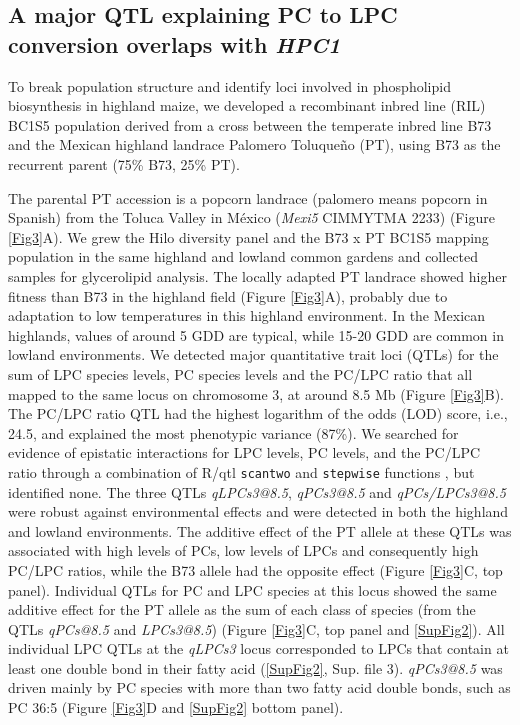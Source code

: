 \documentclass[9pt,twocolumn,twoside,lineno]{biorxiv}
\def\code#1{\texttt{#1}}
\begin{document}
\subsection{A major QTL explaining PC to LPC conversion overlaps with \textit{HPC1}} 
To break population structure and identify loci involved in phospholipid biosynthesis in highland maize, we developed a recombinant inbred line (RIL) BC1S5 population derived from a cross between the temperate inbred line B73 and the Mexican highland landrace Palomero Toluqueño (PT), using B73 as the recurrent parent (75\% B73, 25\% PT). 

The parental PT accession is a popcorn landrace (palomero means popcorn in Spanish) from the Toluca Valley in México (\textit{Mexi5} CIMMYTMA 2233) (Figure \ref{Fig3}A). 
We grew the Hilo diversity panel and the B73 x PT BC1S5 mapping population in the same highland and lowland common gardens and collected samples for glycerolipid analysis.
The locally adapted PT landrace showed higher fitness than B73 in the highland field (Figure \ref{Fig3}A), probably due to adaptation to low temperatures in this highland environment.  
In the Mexican highlands, values of around 5 GDD are typical, while 15-20 GDD are common in lowland environments. 
We detected major quantitative trait loci (QTLs) for the sum of LPC species levels, PC species levels and the PC/LPC ratio that all mapped to the same locus on chromosome 3, at around 8.5 Mb (Figure \ref{Fig3}B). 
The PC/LPC ratio QTL had the highest logarithm of the odds (LOD) score, i.e., 24.5, and explained the most phenotypic variance (87\%). 
We searched for evidence of epistatic interactions for LPC levels, PC levels, and the PC/LPC ratio through a combination of R/qtl \code{scantwo} and \code{stepwise} functions \cite{Broman2003-ac}, but identified none.
The three QTLs \textit{qLPCs3@8.5}, \textit{qPCs3@8.5} and \textit{qPCs/LPCs3@8.5} were robust against environmental effects and were detected in both the highland and lowland environments.
The additive effect of the PT allele at these QTLs was associated with high levels of PCs, low levels of LPCs and consequently high PC/LPC ratios, while the B73 allele had the opposite effect (Figure \ref{Fig3}C, top panel).
Individual QTLs for PC and LPC species at this locus showed the same additive effect for the PT allele as the sum of each class of species (from the QTLs \textit{qPCs@8.5} and \textit{LPCs3@8.5}) (Figure \ref{Fig3}C, top panel and \ref{SupFig2}). 
All individual LPC QTLs at the \textit{qLPCs3} locus corresponded to LPCs that contain at least one double bond in their fatty acid (\ref{SupFig2}, Sup. file 3).
\textit{qPCs3@8.5} was driven mainly by PC species with more than two fatty acid double bonds, such as PC 36:5 (Figure \ref{Fig3}D and \ref{SupFig2} bottom panel).
\end{document}

